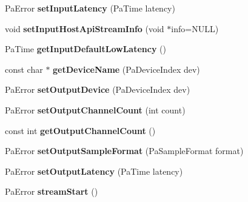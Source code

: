\begin{DoxyCompactItemize}
\item 
\hypertarget{class_port_audio_wrap_a79575cbf76ba487b4edc3e6188e680ad}{Pa\-Error {\bfseries set\-Input\-Latency} (Pa\-Time latency)}\label{class_port_audio_wrap_a79575cbf76ba487b4edc3e6188e680ad}

\item 
\hypertarget{class_port_audio_wrap_a5ce5a1875848b5c93fb769d4186dbcf3}{void {\bfseries set\-Input\-Host\-Api\-Stream\-Info} (void $\ast$info=N\-U\-L\-L)}\label{class_port_audio_wrap_a5ce5a1875848b5c93fb769d4186dbcf3}

\item 
\hypertarget{class_port_audio_wrap_af2b23ddbc2df1f3a8f20ba59db2e26eb}{Pa\-Time {\bfseries get\-Input\-Default\-Low\-Latency} ()}\label{class_port_audio_wrap_af2b23ddbc2df1f3a8f20ba59db2e26eb}

\item 
\hypertarget{class_port_audio_wrap_a17132c9ddbe6b7a184ad5d3ecf4aa66e}{const char $\ast$ {\bfseries get\-Device\-Name} (Pa\-Device\-Index dev)}\label{class_port_audio_wrap_a17132c9ddbe6b7a184ad5d3ecf4aa66e}

\item 
\hypertarget{class_port_audio_wrap_ac5fdc035a033cf426f259d4bac87e4ca}{Pa\-Error {\bfseries set\-Output\-Device} (Pa\-Device\-Index dev)}\label{class_port_audio_wrap_ac5fdc035a033cf426f259d4bac87e4ca}

\item 
\hypertarget{class_port_audio_wrap_aac39854526473140e2b9bcf6c30ce876}{Pa\-Error {\bfseries set\-Output\-Channel\-Count} (int count)}\label{class_port_audio_wrap_aac39854526473140e2b9bcf6c30ce876}

\item 
\hypertarget{class_port_audio_wrap_a29ae357027ce0ac70f52c5a8fc416b16}{const int {\bfseries get\-Output\-Channel\-Count} ()}\label{class_port_audio_wrap_a29ae357027ce0ac70f52c5a8fc416b16}

\item 
\hypertarget{class_port_audio_wrap_a342018893c092acac26509351b45602f}{Pa\-Error {\bfseries set\-Output\-Sample\-Format} (Pa\-Sample\-Format format)}\label{class_port_audio_wrap_a342018893c092acac26509351b45602f}

\item 
\hypertarget{class_port_audio_wrap_a619ad8a126e30b328468a57c8047f2f8}{Pa\-Error {\bfseries set\-Output\-Latency} (Pa\-Time latency)}\label{class_port_audio_wrap_a619ad8a126e30b328468a57c8047f2f8}

\item 
\hypertarget{class_port_audio_wrap_a879e58affa1895a9fd737b44e72b609e}{Pa\-Error {\bfseries stream\-Start} ()}\label{class_port_audio_wrap_a879e58affa1895a9fd737b44e72b609e}


\end{DoxyCompactItemize}
